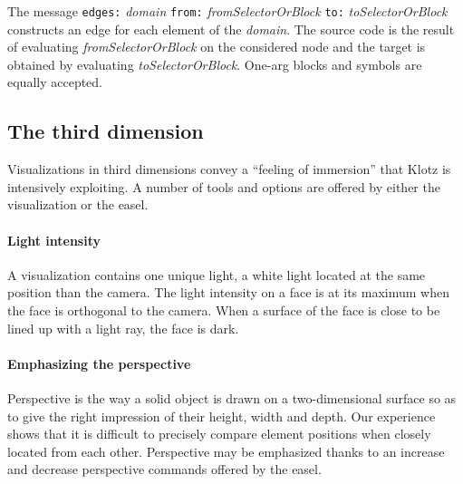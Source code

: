 \documentclass{sig-alternate}
\newcommand{\ct}{\lstinline[backgroundcolor=\color{white},basicstyle=\footnotesize\ttfamily]}
\newcommand{\seclabel}[1]{\label{sec:#1}}
\begin{document}
 The message \ct{edges:} \emph{domain} \ct{from:} \emph{fromSelectorOrBlock} \ct{to:} \emph{toSelectorOrBlock} constructs an edge for each element of the \emph{domain}. The source code is the result of evaluating \emph{fromSelectorOrBlock} on the considered  node and the target is obtained by evaluating  \emph{toSelectorOrBlock}. One-arg blocks and symbols are equally accepted.
 
  


\subsection{The third dimension} \seclabel{3d}

Visualizations in third dimensions convey a ``feeling of immersion'' that Klotz is intensively exploiting. A number of tools and options are offered by either the visualization or the easel.

\paragraph{Light intensity}
A visualization contains one unique light, a white light located at the same position than the camera. The light intensity on a face is at its maximum when the face is orthogonal to the camera. When a surface of the face is close to be lined up with a light ray, the face is dark.

\paragraph{Emphasizing the perspective}
Perspective is the way a solid object is drawn on a two-dimensional surface so as to give the right impression of their height, width and depth. Our experience shows that it is difficult to precisely compare element positions when closely located from each other. Perspective may be emphasized thanks to an increase and decrease perspective commands offered by the easel.

\end{document}
